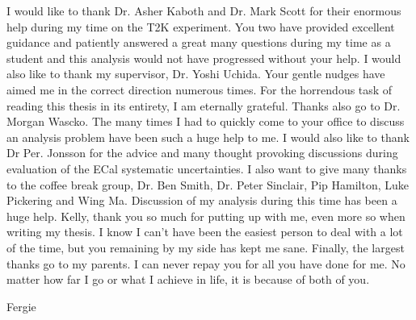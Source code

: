 \begin{acknowledgements}
\noindent I would like to thank Dr. Asher Kaboth and Dr. Mark Scott for their enormous help during my time on the T2K experiment.  You two have provided excellent guidance and patiently answered a great many questions during my time as a student and this analysis would not have progressed without your help.
\newline
\newline
I would also like to thank my supervisor, Dr. Yoshi Uchida.  Your gentle nudges have aimed me in the correct direction numerous times.  For the horrendous task of reading this thesis in its entirety, I am eternally grateful.
\newline
\newline
Thanks also go to Dr. Morgan Wascko.  The many times I had to quickly come to your office to discuss an analysis problem have been such a huge help to me.
\newline
\newline
I would also like to thank Dr Per. Jonsson for the advice and many thought provoking discussions during evaluation of the ECal systematic uncertainties.
\newline
\newline
I also want to give many thanks to the coffee break group, Dr. Ben Smith, Dr. Peter Sinclair, Pip Hamilton, Luke Pickering and Wing Ma.  Discussion of my analysis during this time has been a huge help.
\newline
\newline
Kelly, thank you so much for putting up with me, even more so when writing my thesis.  I know I can't have been the easiest person to deal with a lot of the time, but you remaining by my side has kept me sane.
\newline
\newline
Finally, the largest thanks go to my parents.  I can never repay you for all you have done for me.  No matter how far I go or what I achieve in life, it is because of both of you.
\end{acknowledgements}


%

\tableofcontents


%
  {Fergie}
\thispagestyle{empty}
